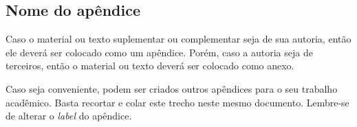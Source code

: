 \begin{apendicesenv}

\chapter{Nome do apêndice} %
\label{chap:apendiceA}

Caso o material ou texto suplementar ou complementar seja de sua autoria, então ele deverá ser colocado como um apêndice. Porém, caso a autoria seja de terceiros, então o material ou texto deverá ser colocado como anexo.

Caso seja conveniente, podem ser criados outros apêndices para o seu trabalho acadêmico. Basta recortar e colar este trecho neste mesmo documento. Lembre-se de alterar o \textit{label} do apêndice.


\end{apendicesenv}
